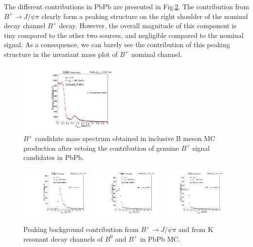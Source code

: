 The different contributions in PbPb are presented in Fig.\ref{BPNPPeak}.
The contribution from $B^+\rightarrow J/\psi \pi$ clearly form a peaking structure on the right shoulder of the nominal decay channel $B^+$ decay. However, the overall magnitude of this component is tiny compared to the other two sources, and negligible compared to the nominal signal. As a consequence, we can barely see the contribution of this peaking structure in the invariant mass plot of $B^+$ nominal channel.

\begin{figure}[h]
\begin{center}
\includegraphics[width= 0.45\textwidth]{Figures/Chapter4/fitNP_PbPb.pdf}
\caption{$B^+$ candidate mass spectrum obtained in inclusive B meson MC production after vetoing the contribution of genuine $B^+$ signal candidates in PbPb.}
\label{NPBP}
\end{center}
\end{figure}

\begin{figure}[h]
\begin{center}
\includegraphics[width= 0.32\textwidth]{Figures/Chapter4/BmassBpPi.pdf}
\includegraphics[width= 0.32\textwidth]{Figures/Chapter4/BmassBpK_tkmatch.pdf}
\includegraphics[width= 0.32\textwidth]{Figures/Chapter4/BmassB0K_tkmatch.pdf}
\caption{Peaking background contribution from $B^+\rightarrow J/\psi \pi$ and from K resonant decay channels of $B^0$ and $B^+$ in PbPb MC.}
\label{BPNPPeak}
\end{center}
\end{figure}

